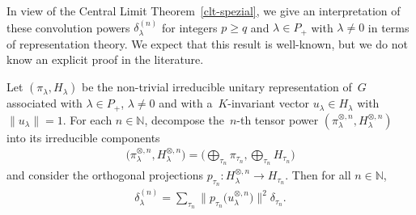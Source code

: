 In view of the Central Limit Theorem~\ref{clt-spezial}, we give an interpretation of these convolution powers
$\delta_\lambda^{(n)}$ for integers $p\ge q$ and $\lambda\in P_+$ with $\lambda\ne 0$ in terms of representation theory.
We expect that this result is well-known, but we do not know an explicit proof in the literature.

\begin{Lemma}
\label{potenzen-tensoren}
Let $(\pi_\lambda,H_\lambda)$ be the non-trivial irreducible unitary representation of~$G$ associated with $\lambda\in
P_+$, $\lambda\ne0$ and with a~$K$-invariant vector $u_\lambda\in H_\lambda$ with $\|u_\lambda\|=1$.
For each $n\in \mathbb N$, decompose the~$n$-th tensor power $(\pi_\lambda^{\otimes, n},H_\lambda^{\otimes, n})$ into
its irreducible components
\begin{gather}
\label{tensor-zerl}
\big(\pi_\lambda^{\otimes, n},H_\lambda^{\otimes, n}\big)=\bigg(\bigoplus_{\tau_n}\pi_{\tau_n}, \bigoplus_{\tau_n} H_{\tau_n}\bigg)
\end{gather}
and consider the orthogonal projections $p_{\tau_n}:H_\lambda^{\otimes, n}\to H_{\tau_n}$.
Then for all $n\in\mathbb N$,
\begin{gather*}
\delta_\lambda^{(n)}= \sum\limits_{\tau_n}\big\|p_{\tau_n}\big(u_\lambda^{\otimes, n}\big)\big\|^2 \delta_{\tau_n}.
\end{gather*}
\end{Lemma}


